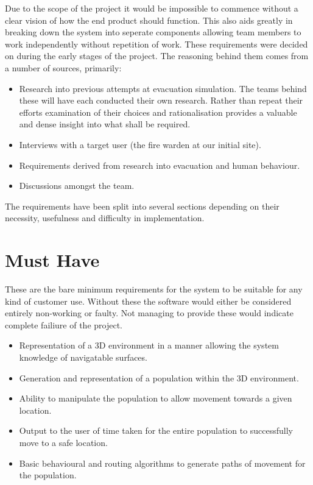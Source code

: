 



Due to the scope of the project it would be impossible to commence
without a clear vision of how the end product should function. This
also aids greatly in breaking down the system into seperate components
allowing team members to work independently without repetition of
work. These requirements were decided on during the early stages of
the project. The reasoning behind them comes from a number of sources,
primarily:
\begin{itemize}
\item Research into previous attempts at evacuation simulation. The teams
behind these will have each conducted their own research. Rather than
repeat their efforts examination of their choices and rationalisation
provides a valuable and dense insight into what shall be required.
\item Interviews with a target user (the fire warden at our initial site).
\item Requirements derived from research into evacuation and human behaviour.
\item Discussions amongst the team.
\end{itemize}
The requirements have been split into several sections depending on
their necessity, usefulness and difficulty in implementation.


\section{Must Have}

These are the bare minimum requirements for the system to be suitable
for any kind of customer use. Without these the software would either
be considered entirely non-working or faulty. Not managing to provide
these would indicate complete failiure of the project.
\begin{itemize}
\item Representation of a 3D environment in a manner allowing the system
knowledge of navigatable surfaces.
\item Generation and representation of a population within the 3D environment.
\item Ability to manipulate the population to allow movement towards a given
location.
\item Output to the user of time taken for the entire population to successfully
move to a safe location.
\item Basic behavioural and routing algorithms to generate paths of movement
for the population.
\end{itemize}

